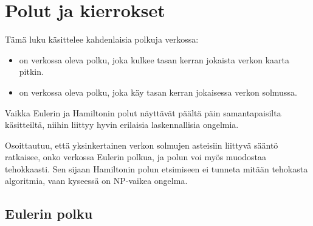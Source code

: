 \chapter{Polut ja kierrokset}

Tämä luku käsittelee kahdenlaisia polkuja verkossa:
\begin{itemize}
\item {} on verkossa oleva
polku, joka kulkee tasan kerran jokaista
verkon kaarta pitkin.
\item {} on verkossa
oleva polku, joka käy tasan kerran
jokaisessa verkon solmussa.
\end{itemize}
Vaikka Eulerin ja Hamiltonin polut
näyttävät päältä päin
samantapaisilta käsitteiltä,
niihin liittyy hyvin erilaisia laskennallisia ongelmia.

Osoittautuu, että yksinkertainen verkon solmujen
asteisiin liittyvä sääntö ratkaisee, onko verkossa
Eulerin polkua, ja polun voi myös muodostaa tehokkaasti.
Sen sijaan Hamiltonin polun etsimiseen ei tunneta
mitään tehokasta algoritmia, vaan kyseessä on
NP-vaikea ongelma.

\section{Eulerin polku}


